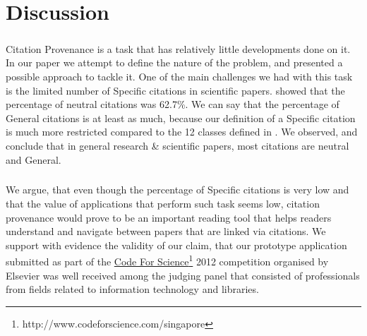 \chapter{Discussion}
\label{discussion}
\paragraph{}
Citation Provenance is a task that has relatively little developments done on it. In our paper we attempt to define the nature of the problem, and presented a possible approach to tackle it. One of the main challenges we had with this task is the limited number of Specific citations in scientific papers. \cite{teufel2009annotation} showed that the percentage of neutral citations was 62.7\%. We can say that the percentage of General citations is at least as much, because our definition of a Specific citation is much more restricted compared to the 12 classes defined in \cite{teufel2009annotation}. We observed, and conclude that in general research \& scientific papers, most citations are neutral and General.

\paragraph{}
We argue, that even though the percentage of Specific citations is very low and that the value of applications that perform such task seems low, citation provenance would prove to be an important reading tool that helps readers understand and navigate between papers that are linked via citations. We support with evidence the validity of our claim, that our prototype application submitted as part of the \url{Code For Science}\footnote{http://www.codeforscience.com/singapore} 2012 competition organised by Elsevier was well received among the judging panel that consisted of professionals from fields related to information technology and libraries.

